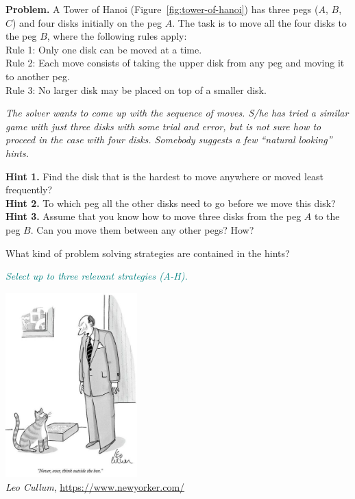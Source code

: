 \documentclass[jou]{apa6}
\begin{document}
\begin{mdframed}[roundcorner=6pt]
{\footnotesize
{\bf Problem.} A Tower of Hanoi (Figure~\ref{fig:tower-of-hanoi}) 
has three pegs ($A$, $B$, $C$) and
four disks initially on the peg $A$. The task is to move all the four disks to the peg $B$, where
the following rules apply:\\
Rule 1: Only one disk can be moved at a time.\\
Rule 2: Each move consists of taking the upper disk from any peg and moving it to 
another peg.\\
Rule 3: No larger disk may be placed on top of a smaller disk.

{\em The solver wants to come up with the sequence of moves. S/he has tried
a similar game with just three disks with some trial and error, but 
is not sure how to proceed in the case with four disks. Somebody suggests 
a few ``natural looking'' hints.}

{\bf Hint 1.} Find the disk that is the hardest to move anywhere or moved least frequently?\\
{\bf Hint 2.} To which peg all the other disks need to go before we move this disk?\\
{\bf Hint 3.} Assume that you know how to move three disks from the peg $A$ to the peg $B$. 
Can you move them between any other pegs? How?
}
\end{mdframed}


What kind of problem solving strategies are contained in the hints?

\textcolor{teal}{\em Select up to three relevant strategies (A-H).}



\begin{center}
\includegraphics[width=2in]{thinking-outside-the-box.png}\\
\textcopyright{} {\em Leo Cullum}, \url{https://www.newyorker.com/}
\end{center}
\end{document}
